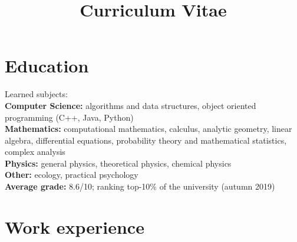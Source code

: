 \documentclass[12pt,a4paper,roman]{moderncv} %
\title{Curriculum Vitae}
\begin{document}
	
	\makecvtitle %
	
	
	\section{Education}
	
	{}{Learned subjects:
		\\\textbf{Computer Science:} algorithms and data structures, object oriented programming (C++, Java, Python)
		\\\textbf{Mathematics:} computational mathematics, calculus, analytic geometry, linear algebra, differential equations, probability theory and mathematical statistics, complex analysis
		\\\textbf{Physics:} general physics, theoretical physics, chemical physics
		\\\textbf{Other:} ecology, practical psychology
		\\\textbf{Average grade:} 8.6/10; ranking top-10\% of the university (autumn 2019)
	}  %
	
	
	
	\section{Work experience}
	
	
\end{document}

